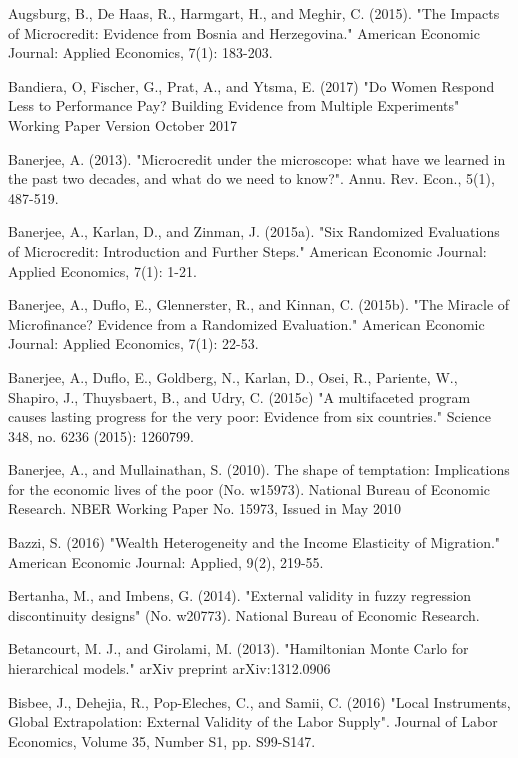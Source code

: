 \documentclass[english,12pt]{article}\usepackage{lmodern}
\numberwithin{equation}{section}
\begin{document}
\begin{thebibliography}{99}
 Augsburg, B., De Haas, R., Harmgart, H., and Meghir, C. (2015). "The Impacts of Microcredit: Evidence from Bosnia and Herzegovina." American Economic Journal: Applied Economics, 7(1): 183-203.

 Bandiera, O, Fischer, G., Prat, A., and Ytsma, E. (2017) "Do Women Respond Less to Performance Pay? Building Evidence from Multiple Experiments" Working Paper Version October 2017

 Banerjee, A. (2013). "Microcredit under the microscope: what have we learned in the past two decades, and what do we need to know?". Annu. Rev. Econ., 5(1), 487-519.

 Banerjee, A., Karlan, D., and Zinman, J. (2015a). "Six Randomized Evaluations of Microcredit: Introduction and Further Steps." American Economic Journal: Applied Economics, 7(1): 1-21.

 Banerjee, A., Duflo, E., Glennerster, R., and Kinnan, C. (2015b). "The Miracle of Microfinance? Evidence from a Randomized Evaluation." American Economic Journal: Applied Economics, 7(1): 22-53.

 Banerjee, A., Duflo, E., Goldberg, N., Karlan, D., Osei, R.,  Pariente, W., Shapiro, J., Thuysbaert, B., and Udry, C. (2015c) "A multifaceted program causes lasting progress for the very poor: Evidence from six countries." Science 348, no. 6236 (2015): 1260799.

 Banerjee, A., and Mullainathan, S. (2010). The shape of temptation: Implications for the economic lives of the poor (No. w15973). National Bureau of Economic Research. NBER Working Paper No. 15973, Issued in May 2010

 Bazzi, S. (2016) "Wealth Heterogeneity and the Income Elasticity of Migration." American Economic Journal: Applied, 9(2), 219-55.

 Bertanha, M., and Imbens, G. (2014). "External validity in fuzzy regression discontinuity designs" (No. w20773). National Bureau of Economic Research.

 Betancourt, M. J., and Girolami, M. (2013). "Hamiltonian Monte Carlo for hierarchical models." arXiv preprint arXiv:1312.0906

 Bisbee, J., Dehejia, R., Pop-Eleches, C., and Samii, C. (2016) "Local Instruments, Global Extrapolation: External Validity of the Labor Supply". Journal of Labor Economics, Volume 35, Number S1, pp. S99-S147.


\end{thebibliography}
\end{document}
